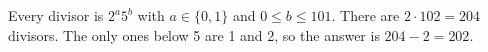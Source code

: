 Every divisor is $2^a5^b$ with $a\in\{0,1\}$ and $0\le b\le101$. There are $2\cdot102=204$ divisors. The only ones below 5 are 1 and 2, so the answer is $204-2=\boxed{202}$.
